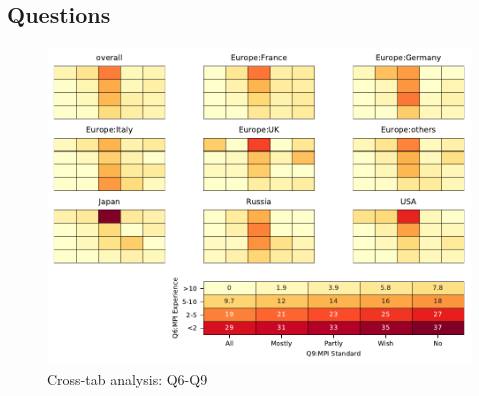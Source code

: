
\subsection{Questions}


\begin{figure}
\begin{center}
\includegraphics[width=12cm]{../pdfs/Q6-Q9.pdf}
\caption{Cross-tab analysis: Q6-Q9}
\label{fig:Q6-Q9}
\end{center}
\end{figure}
